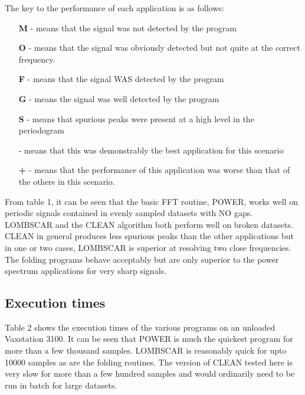 The key to the performance of each application is as follows:

\begin{itemize}

    \item[{\bf M}] - means that the signal was not detected by the program
    \item[{\bf O}] - means that the signal was obviously detected but not quite
             at the correct frequency.
    \item[{\bf F}] - means that the signal WAS detected by the program
    \item[{\bf G}] - means the signal was well detected by the program

    \item[{\bf S}] - means that spurious peaks were present at a high level
             in the periodogram

    \item[{\bf *}] - means that this was demonstrably the best application
             for this scenario 

    \item[{\bf +}] - means that the performance of this application was
             worse than that of the others in this scenario.

\end{itemize}

From table 1, it can be seen that the basic FFT routine, POWER,
works well on periodic signals contained in evenly sampled datasets
with NO gaps. LOMBSCAR and the CLEAN algorithm both perform well
on broken datasets. CLEAN in general produces less spurious peaks
than the other applications but in one or two cases, 
LOMBSCAR is superior at resolving two 
close frequencies. The folding programs behave acceptably but are
only superior to the power spectrum applications for very sharp
signals.

\subsection{Execution times}

Table 2 shows the execution times of the various programs on an
unloaded Vaxstation 3100. It can be seen that POWER is much the 
quickest program for more than a few thousand samples. LOMBSCAR
is reasonably quick for upto 10000 samples as are the folding routines. 
The version of CLEAN tested here is very slow for more than a few hundred
samples and would ordinarily need to be run in batch for large
datasets.

